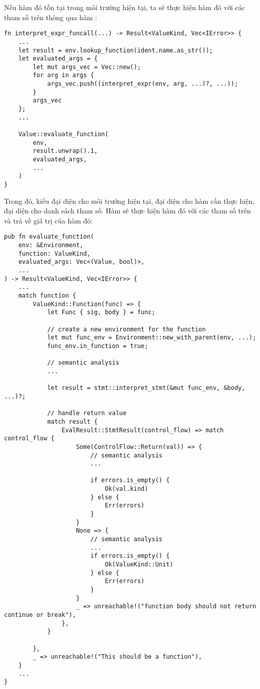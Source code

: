     Nếu hàm đó tồn tại trong môi trường hiện tại, ta sẽ thực hiện hàm đó với các tham số trên thông qua hàm :

\begin{lstlisting}[]
fn interpret_expr_funcall(...) -> Result<ValueKind, Vec<IError>> {
    ...
    let result = env.lookup_function(ident.name.as_str());
    let evaluated_args = {
        let mut args_vec = Vec::new();
        for arg in args {
            args_vec.push((interpret_expr(env, arg, ...)?, ...));
        }
        args_vec
    };
    ...

    Value::evaluate_function(
        env,
        result.unwrap().1,
        evaluated_args,
        ...
    )
}
\end{lstlisting}

    Trong đó,  kiểu  đại diện cho môi trường hiện tại,  đại diện cho hàm cần thực hiện,  đại diện cho danh sách tham số. Hàm  sẽ thực hiện hàm đó với các tham số trên và trả về giá trị của hàm đó:

\begin{lstlisting}[]
pub fn evaluate_function(
    env: &Environment,
    function: ValueKind,
    evaluated_args: Vec<(Value, bool)>,
    ...
) -> Result<ValueKind, Vec<IError>> {
    ...
    match function {
        ValueKind::Function(func) => {
            let Func { sig, body } = func;

            // create a new environment for the function
            let mut func_env = Environment::new_with_parent(env, ...);
            func_env.in_function = true;

            // semantic analysis
            ...

            let result = stmt::interpret_stmt(&mut func_env, &body, ...)?;

            // handle return value
            match result {
                EvalResult::StmtResult(control_flow) => match control_flow {
                    Some(ControlFlow::Return(val)) => {
                        // semantic analysis
                        ...
                        
                        if errors.is_empty() {
                            Ok(val.kind)
                        } else {
                            Err(errors)
                        }
                    }
                    None => {
                        // semantic analysis
                        ...
                        if errors.is_empty() {
                            Ok(ValueKind::Unit)
                        } else {
                            Err(errors)
                        }
                    }
                    _ => unreachable!("function body should not return continue or break"),
                },
            }

        },
        _ => unreachable!("This should be a function"),
    }
    ...
}
\end{lstlisting}

